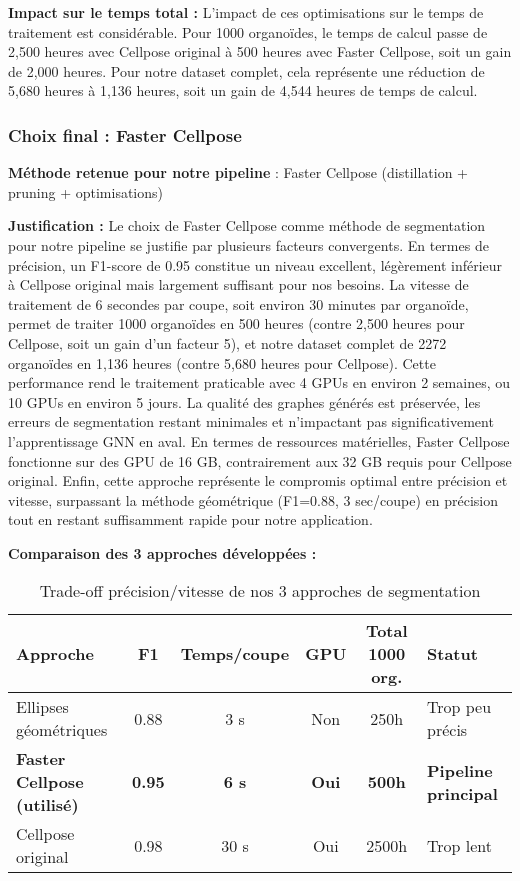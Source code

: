 \textbf{Impact sur le temps total :}
L'impact de ces optimisations sur le temps de traitement est considérable. Pour 1000 organoïdes, le temps de calcul passe de 2,500 heures avec Cellpose original à 500 heures avec Faster Cellpose, soit un gain de 2,000 heures. Pour notre dataset complet, cela représente une réduction de 5,680 heures à 1,136 heures, soit un gain de 4,544 heures de temps de calcul.

\subsubsection{Choix final : Faster Cellpose}

\textbf{Méthode retenue pour notre pipeline} : Faster Cellpose (distillation + pruning + optimisations)

\textbf{Justification :}
Le choix de Faster Cellpose comme méthode de segmentation pour notre pipeline se justifie par plusieurs facteurs convergents. En termes de précision, un F1-score de 0.95 constitue un niveau excellent, légèrement inférieur à Cellpose original mais largement suffisant pour nos besoins. La vitesse de traitement de 6 secondes par coupe, soit environ 30 minutes par organoïde, permet de traiter 1000 organoïdes en 500 heures (contre 2,500 heures pour Cellpose, soit un gain d'un facteur 5), et notre dataset complet de 2272 organoïdes en 1,136 heures (contre 5,680 heures pour Cellpose). Cette performance rend le traitement praticable avec 4 GPUs en environ 2 semaines, ou 10 GPUs en environ 5 jours. La qualité des graphes générés est préservée, les erreurs de segmentation restant minimales et n'impactant pas significativement l'apprentissage GNN en aval. En termes de ressources matérielles, Faster Cellpose fonctionne sur des GPU de 16 GB, contrairement aux 32 GB requis pour Cellpose original. Enfin, cette approche représente le compromis optimal entre précision et vitesse, surpassant la méthode géométrique (F1=0.88, 3 sec/coupe) en précision tout en restant suffisamment rapide pour notre application.

\textbf{Comparaison des 3 approches développées :}
\begin{table}[h]
\centering
\caption{Trade-off précision/vitesse de nos 3 approches de segmentation}
\begin{tabular}{lccccl}
\toprule
\textbf{Approche} & \textbf{F1} & \textbf{Temps/coupe} & \textbf{GPU} & \textbf{Total 1000 org.} & \textbf{Statut} \\
\midrule
Ellipses géométriques & 0.88 & 3 s & Non & 250h & Trop peu précis\\
\textbf{Faster Cellpose (utilisé)} & \textbf{0.95} & \textbf{6 s} & \textbf{Oui} & \textbf{500h} & \textbf{Pipeline principal} \\
Cellpose original & 0.98 & 30 s & Oui & 2500h & Trop lent \\
\bottomrule
\end{tabular}
\end{table}


